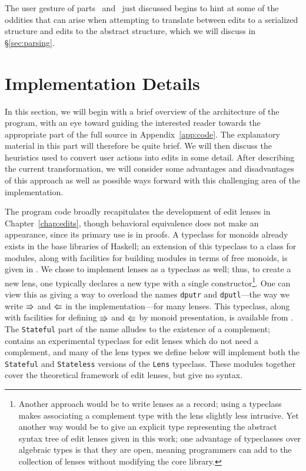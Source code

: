 The user gesture of parts~
and~ just discussed begins to hint at some of the
oddities that can arise
when attempting to translate between edits to a serialized structure and
edits to the abstract structure, which we will discuss in
\S\ref{sec:parsing}.

\section{Implementation Details}
\label{sec:impl-details}
\label{sec:impl-parsing}
\label{sec:parsing}
In this section, we will begin with a brief overview of the architecture of
the program, with an eye toward guiding the interested reader towards the
appropriate part of the full source in Appendix~\ref{app:code}. The explanatory
material in this part will therefore be quite brief. We will then discuss
the heuristics used to convert user actions into edits in some detail. After
describing the current transformation, we will consider some advantages and
disadvantages of this approach as well as possible ways forward with this
challenging area of the implementation.

The program code broadly recapitulates the development of edit lenses in
Chapter~\ref{chap:edits}, though behavioral equivalence does not make an
appearance, since its primary use is in proofs. A typeclass for monoids
already exists in the base libraries of Haskell; an extension of this
typeclass to a class for modules, along with facilities for building modules
in terms of free monoids, is given in . We chose
to implement lenses as a typeclass as well; thus, to create a new lens, one
typically declares a new type with a single constructor\footnote{Another
approach would be to write lenses
as a record; using a typeclass makes associating a complement type with the
lens slightly less intrusive. Yet another way would be to give an explicit
type representing the abstract syntax tree of edit lenses given in this
work; one advantage of typeclasses over algebraic types is that they are
open, meaning programmers can add to the collection of lenses without
modifying the core library.}. One can view this as giving a way to overload
the names \lstinline!dputr! and \lstinline!dputl!---the way we write
$\mathord{\Rrightarrow}$ and $\mathord{\Lleftarrow}$ in the implementation---for many lenses. This
typeclass, along with facilities for
defining $\mathord{\Rrightarrow}$ and $\mathord{\Lleftarrow}$ by monoid presentation, is available from
. The \texttt{Stateful} part of the name
alludes to the existence of a complement; 
contains an experimental typeclass for edit lenses which do not need a
complement, and many of the lens types we define below will implement both
the \texttt{Stateful} and \texttt{Stateless} versions of the \lstinline!Lens!
typeclass. These modules together cover the theoretical framework of edit
lenses, but give no syntax.


